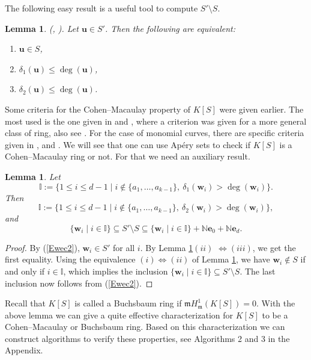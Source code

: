 \documentclass[11pt]{article}
\newtheorem{Lemma}[Theorem]{Lemma}
\def\deg{\operatorname{deg}}
\def\mfr{{\frak m}}
\def\ebf{{\mathbf e}}
\def\ubf{{\mathbf u}}
\def\wbf{{\mathbf w}}
\def\mfr{{\mathfrak m}}
\def\Nset{{\mathbb N}}
\def\Iset{{\mathbb I}}
\theoremstyle{remark}
\theoremstyle{definition}
\begin{document}
 The following easy result is a  useful tool to compute $S'\setminus S$.

\begin{Lemma} \label{A2} {\rm (\cite[Lemma 3.1]{Br}, \cite[Lemma 1]{Ka})}. Let $\ubf \in S'$. Then the following are equivalent:
\begin{enumerate}[\((i)\)]
    \item $\ubf \in S$,
    \item $\delta_1(\ubf) \leq \deg(\ubf)$,
    \item $\delta_2(\ubf) \leq \deg(\ubf)$.
\end{enumerate}
\end{Lemma}

Some criteria for the Cohen--Macaulay property of $K[S]$ were given earlier. The most used is the one given in \cite[Theorem 5.1]{GSW} and \cite[Theorem 6.4]{St}, where a criterion was given for a  more general class of ring, also see \cite[Corollary 4.4]{TH}. For the case of monomial curves, there are specific criteria given in \cite[Lemma 3.1]{T}, \cite[Proposition 2.5]{FH} and \cite[Theorems 2.2, 3.2, 3.6]{HeS}. We will see that one can use Ap\'ery sets to check if $K[S]$ is a Cohen--Macaulay ring or not.  For that we need an auxiliary result.

\begin{Lemma} \label{A3} Let
$$\Iset := \{ 1\le i\le d-1\mid i\not\in \{a_1,\ldots,a_{k-1}\},\ \delta_1(\wbf_i ) > \deg(\wbf_i)\}.$$
Then 
$$\Iset := \{ 1\le i\le d-1\mid i\not\in \{a_1,\ldots,a_{k-1}\},\ \delta_2(\wbf_i) > \deg(\wbf_i)\},$$
and
$$  \{\wbf_i\mid i \in \Iset\} \subseteq S'\setminus S \subseteq  \{\wbf_i\mid i \in \Iset\} + \Nset\ebf_0 + \Nset \ebf_d.$$
\end{Lemma}

\begin{proof} 
By (\ref{Ewec2}), $\wbf_i\in S'$ for all $i$. By Lemma \ref{A2}\((ii)\) $\Leftrightarrow (iii)$, we get the first equality. Using the equivalence $(i)\Leftrightarrow (ii)$ of Lemma \ref{A2}, we have 
$ \wbf_i \not\in S$ if and only if $i \in \Iset$, which implies the inclusion $ \{\wbf_i\mid i \in \Iset\} \subseteq S'\setminus S$. The last inclusion now follows from (\ref{Ewec2}).
\end{proof}

Recall that $K[S]$ is called a Buchsbaum ring if $\mfr H^1_\mfr(K[S]) = 0$. With the above lemma we can give a quite effective characterization for $K[S]$ to be  a Cohen--Macaulay or Buchsbaum ring. Based on this characterization we can construct algorithms to verify these properties, see Algorithms 2 and 3 in the Appendix. 
\end{document}
